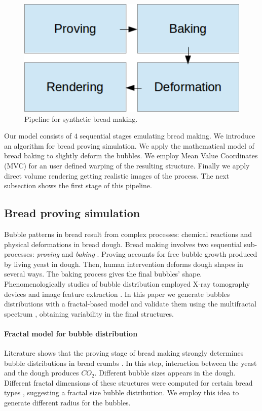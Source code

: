 \documentclass[final,5p,times]{elsarticle}
\begin{document}
\begin{figure}
\includegraphics[scale=0.33]{pipeline.png}
\caption{Pipeline for synthetic bread making.}
\label{Fig2}
\end{figure}
Our model consists of $4$ sequential stages emulating bread making. We introduce an algorithm for bread proving simulation. We apply the mathematical model of bread baking \cite{Powathil2004} to slightly deform the bubbles. We employ Mean Value Coordinates (MVC) \cite{Floater2003} for an user defined warping of the resulting structure. Finally we apply direct volume rendering getting realistic images of the process. The next subsection shows the first stage of this pipeline.

\subsection{Bread proving simulation}
\label{breadprov}
Bubble patterns in bread result from complex processes: chemical reactions and physical deformations in bread dough. Bread making involves two sequential sub-processes: {\em proving} \cite{Babin2006} and {\em baking} \cite{Mondal2008}. Proving accounts for free bubble growth produced by living yeast in dough. Then, human intervention deforms dough shapes in several ways. The baking process gives the final bubbles' shape. Phenomenologically studies of bubble distribution employed X-ray tomography devices and image feature extraction \cite{Babin2006, VanDyck2014,  Gonzales2008}. In this paper we generate bubbles distributions with a fractal-based model \cite{Mandelbrot1982} and validate them using the multifractal spectrum \cite{Xu2009}, obtaining variability in the final structures.

\paragraph{Fractal model for bubble distribution}
Literature shows that the proving stage of bread making strongly determines bubble distributions in bread crumbs \cite{Babin2006}. In this step, interaction between the yeast and the dough produces {\em $CO_{2}$}. Different bubble sizes appears in the dough. Different fractal dimensions of these structures were computed for certain bread types \cite{Gonzales2008} , suggesting a fractal size bubble distribution. We employ this idea to generate different radius for the bubbles.
\end{document}
